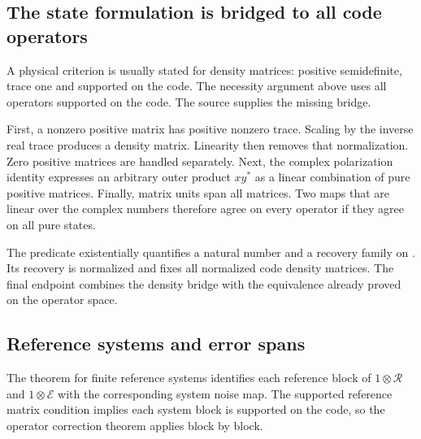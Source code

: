 \subsection{The state formulation is bridged to all code operators}
A physical criterion is usually stated for density matrices: positive semidefinite, trace one and supported on the code. The necessity argument above uses all operators supported on the code. The source supplies the missing bridge.

First, a nonzero positive matrix has positive nonzero trace. Scaling by the inverse real trace produces a density matrix. Linearity then removes that normalization. Zero positive matrices are handled separately. Next, the complex polarization identity expresses an arbitrary outer product $xy^*$ as a linear combination of pure positive matrices. Finally, matrix units span all matrices. Two maps that are linear over the complex numbers therefore agree on every operator if they agree on all pure states.


The predicate  existentially quantifies a natural number and a recovery family on . Its recovery is normalized and fixes all normalized code density matrices. The final endpoint combines the density bridge with the equivalence already proved on the operator space.



\subsection{Reference systems and error spans}
The theorem for finite reference systems identifies each reference block of $1\otimes\mathcal R$ and $1\otimes\mathcal E$ with the corresponding system noise map. The supported reference matrix condition implies each system block is supported on the code, so the operator correction theorem applies block by block.



